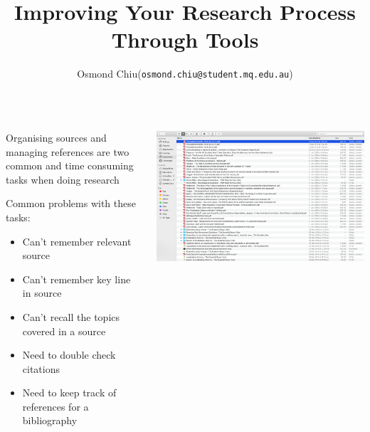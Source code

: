 \documentclass[unknownkeysallowed,usepdftitle=false, parskip=full, aspectratio-1610]{beamer}
\title{Improving Your Research Process Through Tools}
\author{Osmond Chiu\inst (\texttt{osmond.chiu@student.mq.edu.au})}
\institute{Macquarie University}
\newcommand{\secvariable}{nothing}
\newcommand{\mysection}[1]{\renewcommand{\secvariable}{#1}
}
\begin{document}
\mysection{abstract}
\begin{frame}\label{\secvariable}



\parbox{\linewidth}{

\begin{columns}[t]
    \begin{column}[c]{0.5\textwidth}

Organising sources and managing references are two common and time consuming tasks when doing research

 \vspace{12pt}

Common problems with these tasks:
\begin{itemize}
\item Can't remember relevant source
\item Can't remember key line in source
\item Can't recall the topics covered in a source
\item Need to double check citations
\item Need to keep track of references for a bibliography
\end{itemize}

 \end{column}
    \begin{column}[c]{0.5\textwidth}
\includegraphics[width=1\textwidth,height=0.5\textheight,keepaspectratio]{pdf.png}\\

 \vspace{12pt}


 
   \end{column}
  \end{columns}

}

   
\end{frame}
\end{document}
